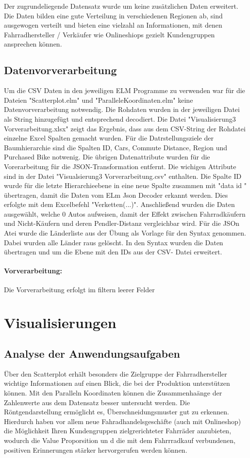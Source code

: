 \documentclass[usegeometry=true]{scrartcl}
\begin{document}
Der zugrundeliegende Datensatz wurde um keine zusätzlichen Daten erweitert. Die Daten bilden eine gute Verteilung in verschiedenen Regionen ab, sind ausgewogen verteilt und bieten eine vielzahl an Informationen, mit denen Fahrradhersteller / Verkäufer wie Onlineshiops gezielt Kundengruppen ansprechen können. 
\subsection{Datenvorverarbeitung}

Um die CSV Daten in den jeweiligen ELM Programme zu verwenden war für die Dateien "Scatterplot.elm" und "ParalleleKoordinaten.elm" keine Datenvorverarbeitung notwendig. Die Rohdaten wurden in der jeweiligen Datei als String hinzugefügt und entsprechend decodiert. 
Die Datei "Visualisierung3 Vorverarbeitung.xlsx" zeigt das Ergebnis, dass aus dem CSV-String der Rohdatei einzelne Excel Spalten gemacht wurden. Für die Datrstellungsziele der Baumhierarchie sind die Spalten ID, Cars, Commute Distance, Region und Purchased Bike notwenig. Die übrigen Datenattribute wurden für die Vorerarbeitung für die JSON-Transformation entfernt.  Die wichigen Attribute sind in der Datei "Visualsierung3 Vorverarbeitung.csv" enthalten. Die Spalte ID wurde für die letzte Hierarchieebene in eine neue Spalte zusammen mit "data id " übertragen, damit die Daten vom ELm Json Decoder erkannt werden. Dies erfolgte mit dem Excelbefehl "Verketten(...)". Anschließend wurden die Daten ausgewählt, welche 0 Autos aufweisen, damit der Effekt zwischen Fahrradkäufern und Nicht-Käufern und deren Pendler-Distanz vergleichbar wird. Für die JSOn Atei wurde die Länderliste aus der Übung als Vorlage für den Syntax genommen. Dabei wurden alle Länder raus gelöscht. In den Syntax wurden die Daten übertragen und um die Ebene mit den IDs aus der CSV- Datei erweitert. 
\paragraph{Vorverarbeitung:} Die Vorverarbeitung erfolgt im filtern leerer Felder

\section{Visualisierungen}
\subsection{Analyse der Anwendungsaufgaben}
Über den Scatterplot erhält besonders die Zielgruppe der Fahrradhersteller wichtige Informationen auf einen Blick, die bei der Produktion unterstützen können. 
Mit den Paralleln Koordinaten können die Zusammenhaänge der Zahlenwerte aus dem Datensatz besser untersucht werden. Die Röntgendarstellung ermöglicht es, Überschneidungsmuster gut zu erkennen. Hierdurch haben vor allem neue Fahradhandelsgeschäfte (auch mit Onlineshop) die Möglichkeit Ihren Kundengruppen zielgrerichteter Fahrräder anzubieten, wodurch die Value Proporsition un d die mit dem Fahrrradkauf verbundenen, positiven Erinnerungen stärker hervorgerufen werden können. 
\end{document}
